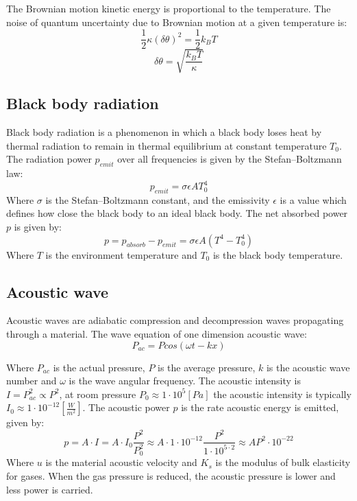 \documentclass[\main/master.tex]{subfiles}
\begin{document}
The Brownian motion kinetic energy is proportional to the temperature. The noise of quantum uncertainty due to Brownian motion at a given temperature is: 
\begin{equation}
\frac{1}{2}\kappa (\delta\theta)^2= \frac{1}{2}k_BT  \label{eqn:Brownian uncertainty}
\end{equation}
\begin{equation}
\delta\theta = \sqrt{\frac{k_B T}{\kappa}}  \label{eqn:Brownian uncertainty 2}
\end{equation}
\fi
\subsection{Black body radiation}
Black body radiation is a phenomenon in which a black body loses heat by thermal radiation to remain in thermal equilibrium at constant temperature $T_0$. The  radiation power $p_{emit}$ over all frequencies is given by the Stefan–Boltzmann law:
\begin{equation}
p_{emit} = \sigma\epsilon A T_0^4  \label{eqn: Stefan–Boltzmann law}
\end{equation}
Where $\sigma$ is the Stefan–Boltzmann constant, and the emissivity $\epsilon$ is a value which defines how close the black body to an ideal black body. The net absorbed power $p$ is given by: 
\begin{equation}
p = p_{absorb}-p_{emit} = \sigma\epsilon A (T^4-T_0^4)  \label{eqn: Stefan–Boltzmann power}
\end{equation}
Where $T$ is the environment temperature and $T_0$ is the black body temperature.  
\subsection{Acoustic wave}
Acoustic waves are adiabatic compression and decompression waves propagating through a material. The wave equation of one dimension acoustic wave:
\begin{equation}
P_{ac} = P cos(\omega t -k x)       \label{eqn:acoustic_pressure}
\end{equation}
\par\noindent
Where $P_{ac}$ is the actual pressure, $P$ is the average pressure, $k$ is the acoustic wave number and $\omega$ is the wave angular frequency. The acoustic intensity is $I = P_{ac}^2 \propto P^2$, at room pressure $P_0\approx 1\cdot 10^{5} [Pa]$ the acoustic intensity is typically $I_0\approx 1\cdot 10^{-12}[\frac{W}{m^2}]$. The acoustic power $p$ is the rate acoustic energy is emitted, given by:
\begin{equation}
p = A\cdot I = A\cdot I_0\frac{P^2} {P_0^2} \approx A\cdot 1\cdot 10^{-12}\frac{P^2} {1\cdot 10^{5\cdot 2}}\approx AP^2\cdot 10^{-22} \label{eqn:acoustic power}
\end{equation}
Where $u$ is the material acoustic velocity and $K_s$ is the modulus of bulk elasticity for gases. When the gas pressure is reduced, the acoustic pressure is lower and less power is carried.
\end{document}
